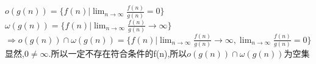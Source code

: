\documentclass[a4paper, justified]{tufte-handout}
\begin{document}
\begin{problem}[TC Exercise 3.1-7]
\end{problem}

\begin{solution}
  $o(g(n)) = \{f(n)|\lim_{n \to \infty} \frac{f(n)}{g(n)} = 0\}$\\
  $\omega (g(n)) = \{f(n) | \lim_{n \to \infty} \frac{f(n)}{g(n)} \rightarrow \infty\}$\\
  $\Rightarrow o(g(n)) \cap \omega (g(n)) = \{f(n) | \lim_{n \to \infty} \frac{f(n)}{g(n)} \rightarrow \infty, \lim_{n \to \infty} \frac{f(n)}{g(n)} = 0\}$\\
  显然,$0 \neq \infty$.所以一定不存在符合条件的f(n),所以$o(g(n)) \cap \omega (g(n))$为空集
\end{solution}

\begin{problem}[TC Problem 3-3 (a)]
\end{problem}
\end{document}
